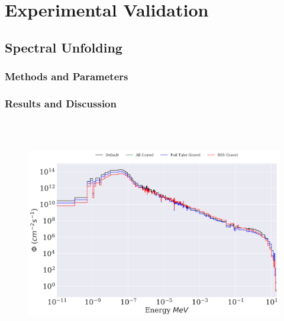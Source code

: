 
\cleardoublepage


\chapter{Experimental Validation}







\section{Spectral Unfolding}

\subsection{Methods and Parameters}

\subsection{Results and Discussion}


\begin{figure}[htb]
\includegraphics[height=4in]{tex/figures/unfolded_gr.png}
\caption[]{}
\label{fig:unfolded_gr}
\end{figure}

